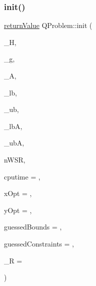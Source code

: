 \subsubsection{\texorpdfstring{init()}{init()}\hspace{0.1cm}{\footnotesize\ttfamily [1/3]}}
{\footnotesize\ttfamily \hyperlink{_message_handling_8hpp_a81d556f613bfbabd0b1f9488c0fa865e}{return\+Value} Q\+Problem\+::init (\begin{DoxyParamCaption}\item[{\hyperlink{class_symmetric_matrix}{Symmetric\+Matrix} $\ast$}]{\+\_\+H,  }\item[{const \hyperlink{qp_o_a_s_e_s__wrapper_8h_a0d00e2b3dfadee81331bbb39068570c4}{real\+\_\+t} $\ast$const}]{\+\_\+g,  }\item[{\hyperlink{class_matrix}{Matrix} $\ast$}]{\+\_\+A,  }\item[{const \hyperlink{qp_o_a_s_e_s__wrapper_8h_a0d00e2b3dfadee81331bbb39068570c4}{real\+\_\+t} $\ast$const}]{\+\_\+lb,  }\item[{const \hyperlink{qp_o_a_s_e_s__wrapper_8h_a0d00e2b3dfadee81331bbb39068570c4}{real\+\_\+t} $\ast$const}]{\+\_\+ub,  }\item[{const \hyperlink{qp_o_a_s_e_s__wrapper_8h_a0d00e2b3dfadee81331bbb39068570c4}{real\+\_\+t} $\ast$const}]{\+\_\+lbA,  }\item[{const \hyperlink{qp_o_a_s_e_s__wrapper_8h_a0d00e2b3dfadee81331bbb39068570c4}{real\+\_\+t} $\ast$const}]{\+\_\+ubA,  }\item[{\hyperlink{_types_8hpp_ab6fd6105e64ed14a0c9281326f05e623}{int\+\_\+t} \&}]{n\+W\+SR,  }\item[{\hyperlink{qp_o_a_s_e_s__wrapper_8h_a0d00e2b3dfadee81331bbb39068570c4}{real\+\_\+t} $\ast$const}]{cputime = {},  }\item[{const \hyperlink{qp_o_a_s_e_s__wrapper_8h_a0d00e2b3dfadee81331bbb39068570c4}{real\+\_\+t} $\ast$const}]{x\+Opt = {},  }\item[{const \hyperlink{qp_o_a_s_e_s__wrapper_8h_a0d00e2b3dfadee81331bbb39068570c4}{real\+\_\+t} $\ast$const}]{y\+Opt = {},  }\item[{const \hyperlink{class_bounds}{Bounds} $\ast$const}]{guessed\+Bounds = {},  }\item[{const \hyperlink{class_constraints}{Constraints} $\ast$const}]{guessed\+Constraints = {},  }\item[{const \hyperlink{qp_o_a_s_e_s__wrapper_8h_a0d00e2b3dfadee81331bbb39068570c4}{real\+\_\+t} $\ast$const}]{\+\_\+R = {} }\end{DoxyParamCaption})}

